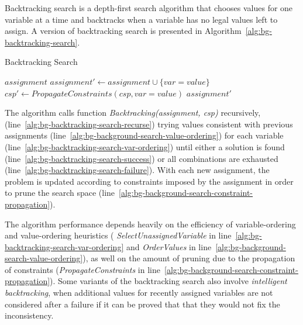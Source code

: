 Backtracking search is a depth-first search algorithm that chooses
values for one variable at a time and backtracks when a variable has
no legal values left to assign. A version of backtracking search is
presented in Algorithm~\ref{alg:bg-backtracking-search}.
\begin{algorithm}
\caption{Backtracking Search}
\label{alg:bg-backtracking-search}
\begin{algorithmic}[1]
   \Return $assignment$
\EndIf
{} \label{alg:bg-backtracking-search-var-ordering}
 \label{alg:bg-background-search-value-ordering}
  \State $assignment' \leftarrow assignment \cup \{var=value\}$
  \State $csp' \leftarrow PropagateConstraints(csp, var=value)$ \label{alg:bg-background-search-constraint-propagation}
   \label{alg:bg-backtracking-search-recurse}
     \Return $assignment'$ \label{alg:bg-backtracking-search-success}
  \EndIf
\EndFor
{} \label{alg:bg-backtracking-search-failure}
\EndProcedure
\end{algorithmic}
\end{algorithm}
The algorithm calls function {\em Backtracking(assignment, csp)}
recursively, (line~\ref{alg:bg-backtracking-search-recurse})
trying values consistent with previous assignments
(line~\ref{alg:bg-background-search-value-ordering})
for each variable
(line~\ref{alg:bg-backtracking-search-var-ordering})
until either a solution is found
(line~\ref{alg:bg-backtracking-search-success}) or all combinations
are exhausted (line~\ref{alg:bg-backtracking-search-failure}). With
each new assignment, the problem is updated according to constraints
imposed by the assignment in order to prune the search space (line~\ref{alg:bg-background-search-constraint-propagation}).

The algorithm performance depends heavily on the efficiency of
variable-ordering and value-ordering heuristics ({\em
  SelectUnassignedVariable} in
line~\ref{alg:bg-backtracking-search-var-ordering}
and {\em  OrderValues} in
line~\ref{alg:bg-background-search-value-ordering}), as well on the
amount of pruning due to the propagation of constraints
({\em PropagateConstraints} in line~\ref{alg:bg-background-search-constraint-propagation}). Some
variants of the backtracking search also involve {\em intelligent
  backtracking}, when additional values for recently assigned
variables are not considered after a failure if it can be proved
that that they would not fix the inconsistency.


